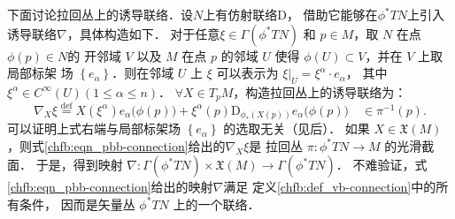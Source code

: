 下面讨论{\kaishu 拉回丛上的诱导联络}．设$N$上有仿射联络$\mathrm{D}$， 
借助它能够在$\phi^* T N$上引入诱导联络$\nabla$，具体构造如下．
对于任意$\xi \in \Gamma(\phi^* T N)$ 和 $p \in M$，取 $N$ 在点 $\phi(p) \in N$的
开邻域 $V$ 以及 $M$ 在点 $p$ 的邻域 $U$ 使得 $\phi(U) \subset V$，并在 $V$ 上取局部标架
场 $\left\{e_\alpha\right\}$．则在邻域 $U$ 上 $\xi$ 可以表示为
$\xi |_U=\xi^\alpha \cdot e_\alpha$，
其中$\xi^\alpha \in C^{\infty}(U)(1 \leqslant \alpha \leqslant n)$．
$\forall X \in T_p M$，构造{\heiti 拉回丛上的诱导联络}为：
\begin{equation}\label{chfb:eqn_pbb-connection}
    \nabla_X \xi \overset{\mathrm {def}}{=} X(\xi^\alpha ) e_\alpha\bigl(\phi(p)\bigr)+\xi^\alpha(p) 
    \mathrm{D}_{\phi_*(X(p))} e_\alpha\bigl(\phi(p)\bigr) \quad \in \pi^{-1}(p) .
\end{equation}
可以证明上式右端与局部标架场 $\left\{e_\alpha\right\}$ 的选取无关（见后）．
如果 $X \in \mathfrak{X}(M)$，则式\eqref{chfb:eqn_pbb-connection}给出的$\nabla_X \xi$是
拉回丛 $\pi: \phi^* T N \rightarrow M$ 的光滑截面．
于是，得到映射 $\nabla: \Gamma\left(\phi^* T N\right)\times \mathfrak{X}(M) 
\rightarrow \Gamma\left(\phi^* T N\right)$．
不难验证，式\eqref{chfb:eqn_pbb-connection}给出的映射$\nabla$满足
定义\ref{chfb:def_vb-connection}中的所有条件，
因而是矢量丛 $\phi^* T N$ 上的一个联络．


